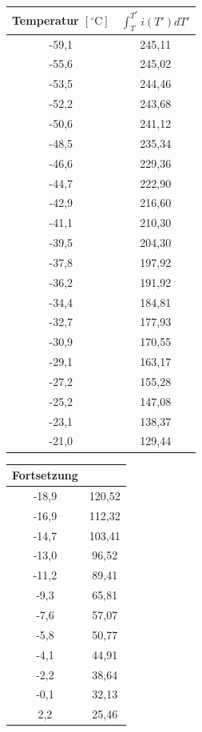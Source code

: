\begin{table}[htbp]
\begin{minipage}[t]{0.45\textwidth}
\centering
\begin{tabular}{c|c}
Temperatur $[^\circ\text{C}]$ & $\int ^{T^*}_{T} i(T')dT'$\\\hline
-59,1 &245,11\\\hline
-55,6 &245,02\\\hline
-53,5 &244,46\\\hline
-52,2 &243,68\\\hline
-50,6 &241,12\\\hline
-48,5 &235,34\\\hline
-46,6 &229,36\\\hline
-44,7 &222,90\\\hline
-42,9 &216,60\\\hline
-41,1 &210,30\\\hline
-39,5 &204,30\\\hline
-37,8 &197,92\\\hline
-36,2 &191,92\\\hline
-34,4 &184,81\\\hline
-32,7 &177,93\\\hline
-30,9 &170,55\\\hline
-29,1 &163,17\\\hline
-27,2 &155,28\\\hline
-25,2 &147,08\\\hline
-23,1 &138,37\\\hline
-21,0 &129,44\\
\end{tabular}
\end{minipage}
\begin{minipage}[t]{0.45\textwidth}
\centering
\begin{tabular}{c|c}
Fortsetzung & \\\hline
-18,9 &120,52\\\hline
-16,9 &112,32\\\hline
-14,7 &103,41\\\hline
-13,0 &96,52\\\hline
-11,2 &89,41\\\hline
-9,3 &65,81\\\hline
-7,6 &57,07\\\hline
-5,8 &50,77\\\hline
-4,1 &44,91\\\hline
-2,2 &38,64\\\hline
-0,1 &32,13\\\hline
2,2 &25,46\\\hline

\end{tabular}
\end{minipage}
\end{table}
